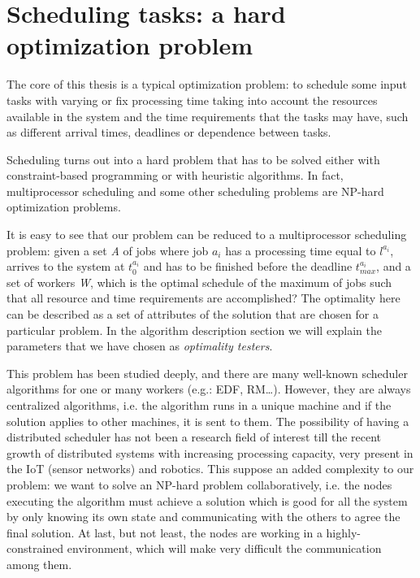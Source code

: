 \section{Scheduling tasks: a hard optimization problem}
The core of this thesis is a typical optimization problem: to schedule some input tasks with varying or fix processing time taking into account the resources available in the system and the time requirements that the tasks may have, such as different arrival times, deadlines or dependence between tasks.

Scheduling turns out into a hard problem that has to be solved either with constraint-based programming or with heuristic algorithms. In fact, multiprocessor scheduling and some other scheduling problems are NP-hard optimization problems.

It is easy to see that our problem can be reduced to a multiprocessor scheduling problem: given a set \emph{A} of jobs where job $a_i$ has a processing time equal to $l^{a_{i}}$, arrives to the system at $t_0^{a_i}$ and has to be finished before the deadline $t_{max}^{a_i}$, and a set of workers \emph{W}, which is the optimal schedule of the maximum of jobs such that all resource and time requirements are accomplished? The optimality here can be described as a set of attributes of the solution that are chosen for a particular problem. In the algorithm description section we will explain the parameters that we have chosen as \emph{optimality testers}.

This problem has been studied deeply, and there are many well-known scheduler algorithms for one or many workers (e.g.: EDF,  RM…). However, they are always centralized algorithms, i.e. the algorithm runs in a unique machine and if the solution applies to other machines, it is sent to them. The possibility of having a distributed scheduler has not been a research field of interest till the recent growth of distributed systems with increasing processing capacity, very present in the IoT (sensor networks) and robotics. This suppose an added complexity to our problem: we want to solve an NP-hard problem 
collaboratively, i.e. the nodes executing the algorithm must achieve a solution which is good for all the system by only knowing its own state and communicating with the others to agree the final solution. At last, but not least, the nodes are working in a highly-constrained environment, which will make very difficult the communication among them.


